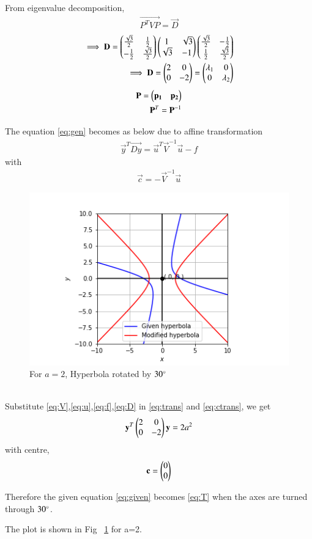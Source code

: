 \documentclass[journal,12pt,twocolumn]{IEEEtran}
\begin{document}
From eigenvalue decomposition,
\begin{align}
    \vec{P^TVP}=\vec{D}\label{eq:eigval}
\end{align}
\begin{align}
    \implies\mathbf{D}=\begin{pmatrix}\frac{\sqrt{3}}{2} & \frac{1}{2} \\ -\frac{1}{2} & \frac{\sqrt{3}}{2}\end{pmatrix}\begin{pmatrix}1 & \sqrt{3} \\ \sqrt{3} & -1\end{pmatrix}\begin{pmatrix}\frac{\sqrt{3}}{2} & -\frac{1}{2} \\ \frac{1}{2} & \frac{\sqrt{3}}{2}\end{pmatrix}\\
    \implies\mathbf{D}=\begin{pmatrix}2 & 0 \\ 0 & -2\end{pmatrix}=\begin{pmatrix}\lambda_1 & 0 \\ 0 & \lambda_2\end{pmatrix}\label{eq:D}
\end{align}
\begin{align}
    \mathbf{P}=\begin{pmatrix}\mathbf{p_1} & \mathbf{p_2}\end{pmatrix}\\
    \mathbf{P}^T=\mathbf{P}^{-1}
\end{align}

The equation \eqref{eq:gen} becomes as below due to affine transformation
\begin{align}
    \vec{y}^T\vec{Dy}=\vec{u}^T\vec{V}^{-1}\vec{u}-f\label{eq:trans}
\end{align}
with 
\begin{align}
    \vec{c}=-\vec{V}^{-1}\vec{u}\label{eq:ctrans}
\end{align}
\renewcommand{\thefigure}{1}
\begin{figure}[ht!]
    \centering
    \includegraphics[width=\columnwidth]{Figure}
    \caption{For $a=2$, Hyperbola rotated by $30\degree$}
    \label{fig:figure1}
\end{figure}\\
Substitute \eqref{eq:V},\eqref{eq:u},\eqref{eq:f},\eqref{eq:D} in \eqref{eq:trans} and \eqref{eq:ctrans}, we get
\begin{align}
    \mathbf{y}^T\begin{pmatrix}2 & 0 \\ 0 & -2\end{pmatrix}\mathbf{y}=2a^2\label{eq:T}
\end{align}
with centre,
\begin{align}
    \mathbf{c}=\begin{pmatrix}0 \\ 0\end{pmatrix}
\end{align}

Therefore the given equation \eqref{eq:given} becomes \eqref{eq:T} when the axes are turned through $30\degree$.

The plot is shown in Fig ~\ref{fig:figure1} for a=2.
\end{document}
